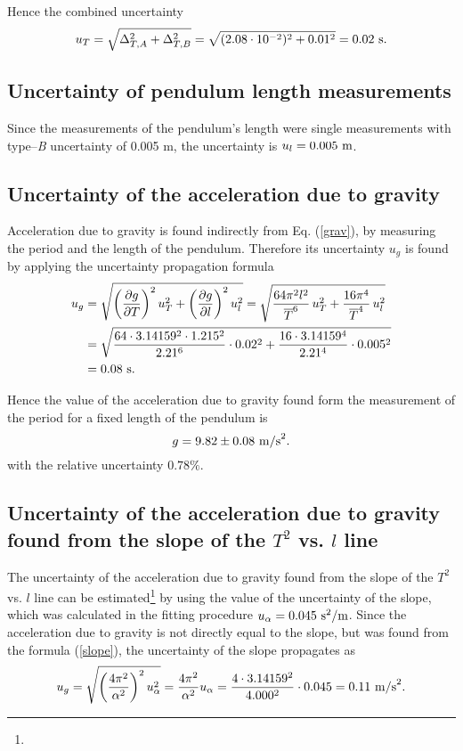 \documentclass{article}
\begin{document}
Hence the combined uncertainty $$u_T = \sqrt{\Delta_{T,A}^2 + \Delta_{T,B}^2} = \sqrt{(2.08 \cdot 10^{-2})^2+0.01^2} = 0.02 \ {\rm{s}}.$$

\subsection{Uncertainty of pendulum length measurements}

Since the measurements of the pendulum's length were single measurements with type--\textit{B} uncertainty of 0.005 m, the uncertainty is $u_l = 0.005\ {\rm{m}}$.


\subsection{Uncertainty of the acceleration due to gravity}
Acceleration due to gravity is found indirectly from Eq. (\ref{grav}), by measuring the period and the length of the pendulum.  Therefore its uncertainty $u_g$ is found by applying the uncertainty propagation formula
\begin{align*}
u_{g} &= \sqrt{\left(\frac{\partial g}{\partial T}\right)^2 u_T^2 + \left(\frac{\partial g}{\partial l}\right)^2 u_l^2}
=
\sqrt{\frac{64\pi^2l^2}{\overline{T}^6}\, u_T^2 + \frac{16\pi^4}{\overline{T}^4}\, u_l^2} \\
&=\sqrt{\frac{64 \cdot 3.14159^2 \cdot 1.215^2}{2.21^6}\cdot 0.02^2+ \frac{16 \cdot 3.14159^4}{2.21^4}\cdot 0.005^2} \\
&= 0.08\ {\rm{s}}.
\end{align*}

Hence the  value of the acceleration due to gravity found form the measurement of the period for a fixed length of the pendulum is
$$
g=9.82\pm 0.08 \ {\rm{m/s}}^2.
$$
with the relative uncertainty $0.78\%$.

\subsection{Uncertainty of the acceleration due to gravity found from the slope of the $T^2$ vs. $l$ line}

The uncertainty of the acceleration due to gravity found from the slope of the $T^2$ vs. $l$ line can be estimated\footnote{{\color{blue}{This is an estimate only, since in the measurements the values of both $l$ and $T^2$ are uncertain, unlike in the classical regression problem.}}} by using the value of the uncertainty of the slope, which was calculated in the fitting procedure $u_\alpha = 0.045\ {\rm{s^2/m}}$.  Since the acceleration due to gravity is not directly equal to the slope, but was found from the formula (\ref{slope}), the uncertainty of the slope propagates as
$$
u_g = \sqrt{\left(\frac{4\pi^2}{\alpha^2}\right)^2 u_\alpha^2} = \frac{4\pi^2}{\alpha^2} u_\alpha =
\frac{4\cdot 3.14159^2}{4.000^2}\cdot0.045 = 0.11\ {\rm{m/s}}^2.
$$
\end{document}
